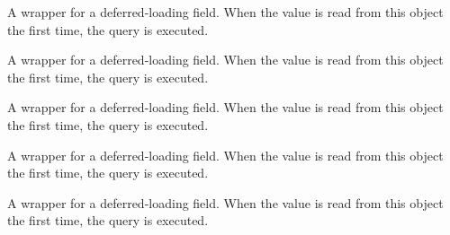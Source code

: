 \documentclass[letterpaper,10pt,english]{sphinxmanual}
\begin{document}
\begin{fulllineitems}

\begin{fulllineitems}
\label{\detokenize{QuChemPedIA.models:QuChemPedIA.models.UserModel.Utilisateur.active}}
A wrapper for a deferred-loading field. When the value is read from this
object the first time, the query is executed.

\end{fulllineitems}


\begin{fulllineitems}
\label{\detokenize{QuChemPedIA.models:QuChemPedIA.models.UserModel.Utilisateur.admin}}
A wrapper for a deferred-loading field. When the value is read from this
object the first time, the query is executed.

\end{fulllineitems}


\begin{fulllineitems}
\label{\detokenize{QuChemPedIA.models:QuChemPedIA.models.UserModel.Utilisateur.affiliation}}
A wrapper for a deferred-loading field. When the value is read from this
object the first time, the query is executed.

\end{fulllineitems}


\begin{fulllineitems}
\label{\detokenize{QuChemPedIA.models:QuChemPedIA.models.UserModel.Utilisateur.city}}
A wrapper for a deferred-loading field. When the value is read from this
object the first time, the query is executed.

\end{fulllineitems}


\begin{fulllineitems}
\label{\detokenize{QuChemPedIA.models:QuChemPedIA.models.UserModel.Utilisateur.country}}
A wrapper for a deferred-loading field. When the value is read from this
object the first time, the query is executed.


\end{fulllineitems}
\end{fulllineitems}
\end{document}
